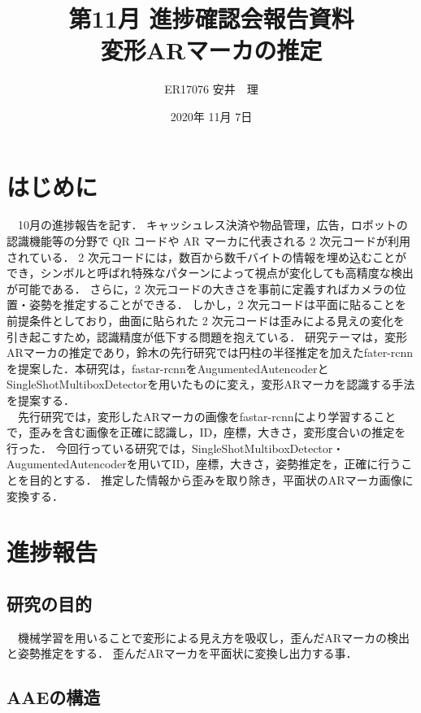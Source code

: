 \documentclass[11pt,a4j,ascmac]{jsarticle}
\title{第11月 進捗確認会報告資料\\
変形ARマーカの推定}
\author{ER17076 安井　理}
\date{2020年 11月 7日}
\begin{document}
\maketitle
\section{はじめに}
　10月の進捗報告を記す．
 キャッシュレス決済や物品管理，広告，ロボットの認識機能等の分野で QR コードや AR マーカに代表される 2 次元コードが利用されている．
2 次元コードには，数百から数千バイトの情報を埋め込むことができ，シンボルと呼ばれ特殊なパターンによって視点が変化しても高精度な検出が可能である．
さらに，2 次元コードの大きさを事前に定義すればカメラの位置・姿勢を推定することができる．
しかし，2 次元コードは平面に貼ることを前提条件としており，曲面に貼られた 2 次元コードは歪みによる見えの変化を引き起こすため，認識精度が低下する問題を抱えている．
研究テーマは，変形ARマーカの推定であり，鈴木の先行研究では円柱の半径推定を加えたfater-rcnnを提案した．本研究は，fastar-rcnnをAugumentedAutencoderとSingleShotMultiboxDetectorを用いたものに変え，変形ARマーカを認識する手法を提案する．\\
　先行研究では，変形したARマーカの画像をfastar-rcnnにより学習することで，歪みを含む画像を正確に認識し，ID，座標，大きさ，変形度合いの推定を行った．
今回行っている研究では，SingleShotMultiboxDetector・AugumentedAutencoderを用いてID，座標，大きさ，姿勢推定を，正確に行うことを目的とする．
推定した情報から歪みを取り除き，平面状のARマーカ画像に変換する．


\section{進捗報告}

\subsection{研究の目的}
　機械学習を用いることで変形による見え方を吸収し，歪んだARマーカの検出と姿勢推定をする．
歪んだARマーカを平面状に変換し出力する事．



\subsection{AAEの構造}
\end{document}
